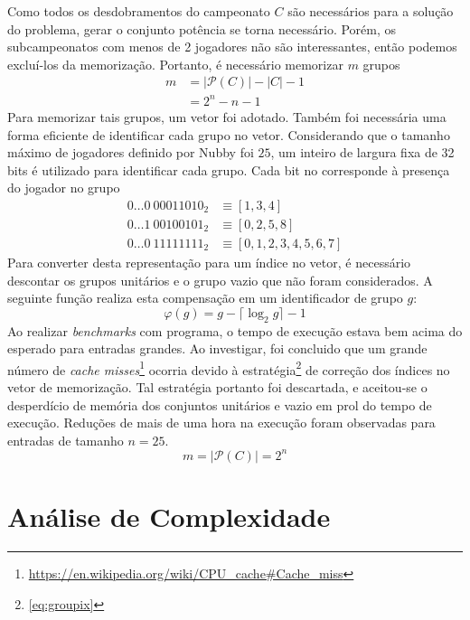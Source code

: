 \documentclass{article}
\begin{document}
Como todos os desdobramentos do campeonato $C$ são necessários para a solução do problema, gerar o conjunto potência se torna necessário. Porém, os subcampeonatos com menos de 2 jogadores não são interessantes, então podemos excluí-los da memorização. Portanto, é necessário memorizar $m$ grupos
\begin{align*}
  m & = |\mathcal{P}(C)| - |C| - 1 \\
  & = 2^n - n - 1
\end{align*}
Para memorizar tais grupos, um vetor foi adotado. Também foi necessária uma forma eficiente de identificar cada grupo no vetor. Considerando que o tamanho máximo de jogadores definido por Nubby foi $25$, um inteiro de largura fixa de 32 bits é utilizado para identificar cada grupo. Cada bit no corresponde à presença do jogador no grupo
\begin{align*}
  0 \hdots 0 \> 00011010_2 &\equiv [1, 3, 4] \\
  0 \hdots 1 \> 00100101_2 &\equiv [0, 2, 5, 8] \\
  0 \hdots 0 \> 11111111_2 &\equiv [0, 1, 2, 3, 4, 5, 6, 7]
\end{align*}
Para converter desta representação para um índice no vetor, é necessário descontar os grupos unitários e o grupo vazio que não foram considerados. A seguinte função realiza esta compensação em um identificador de grupo $g$:
\begin{equation} \label{eq:groupix}
  \varphi(g) = g - \lceil \log_2 g \rceil - 1
\end{equation}
Ao realizar \textit{benchmarks} com programa, o tempo de execução estava bem acima do esperado para entradas grandes. Ao investigar, foi concluido que um grande número de \textit{cache misses}\footnote{\url{https://en.wikipedia.org/wiki/CPU_cache\#Cache_miss}} ocorria devido à estratégia\footnote{\autoref{eq:groupix}} de correção dos índices no vetor de memorização. Tal estratégia portanto foi descartada, e aceitou-se o desperdício de memória dos conjuntos unitários e vazio em prol do tempo de execução. Reduções de mais de uma hora na execução foram observadas para entradas de tamanho $n = 25$.
\begin{equation} \label{eq:memory}
  m = |\mathcal{P}(C)| = 2^n
\end{equation}
\pagebreak


\section{Análise de Complexidade}
\end{document}

